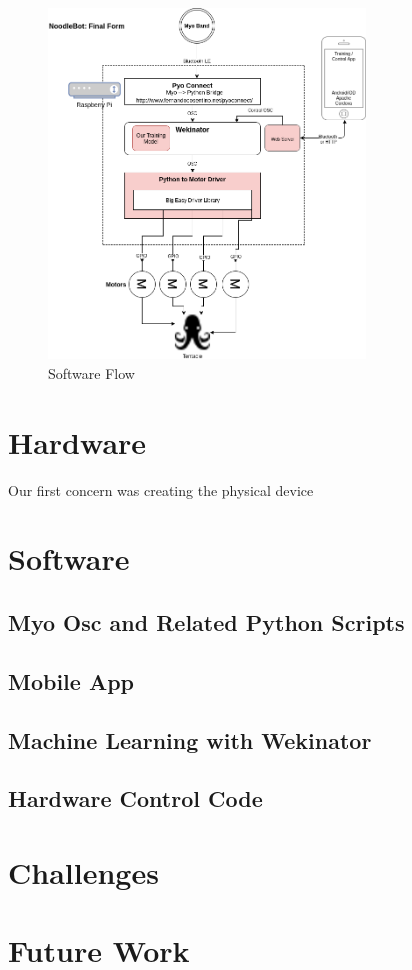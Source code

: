 \documentclass[12pt,a4paper]{article}
\begin{document}
\begin{figure}[h]
\centering
\includegraphics[width=0.75\textwidth]{SoftwareFlow.png}\par\vspace{1cm}
\caption{Software Flow}
\label{fig:flow}
\end{figure}


\section{Hardware}

Our first concern was creating the physical device

\section{Software}

\subsection{Myo Osc and Related Python Scripts}

\subsection{Mobile App}

\subsection{Machine Learning with Wekinator}

\subsection{Hardware Control Code}

\section{Challenges}

\section{Future Work}
\end{document}
